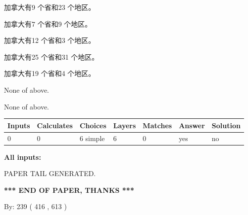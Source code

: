 \documentclass{ctexart}
\begin{document}
 
加拿大有9 个省和23 个地区。
 
 
加拿大有7 个省和9 个地区。
 
 
加拿大有12 个省和3 个地区。
 
 
加拿大有25 个省和31 个地区。
 
 
加拿大有19 个省和4 个地区。
 
 
 None of above.
 
 
\noindent{}
 
 
 None of above.
 
 
\noindent{}
 
 
   
   
   
   
\noindent\begin{tabular}{|l|l|l|l|l|l|l|}
 \hline
Inputs & Calculates & Choices & Layers & Matches & Answer & Solution \\ \hline
 0  & 
 0  & 
 6
  simple  
  & 
 6  & 
 0  & 
  yes & 
  no 
  \\ \hline
 \end{tabular}
   
   
   
   
\noindent{}
   
   
   
   
\noindent\vspace{0.1in}\hspace{-0.08in} {\textbf{\Large{All inputs: }}}
   
   
   
   
   
   
 \vspace{0.2in}
 
   
   
\vspace{2.0in} PAPER TAIL GENERATED.
   
   
   
   
\vspace{1.0in} 
{\textbf{\large{ *** END OF PAPER, THANKS *** }}} 
   
   
\hspace{1.0in} By: 
 239 ( 416 ,  613 )
   
\end{document}
